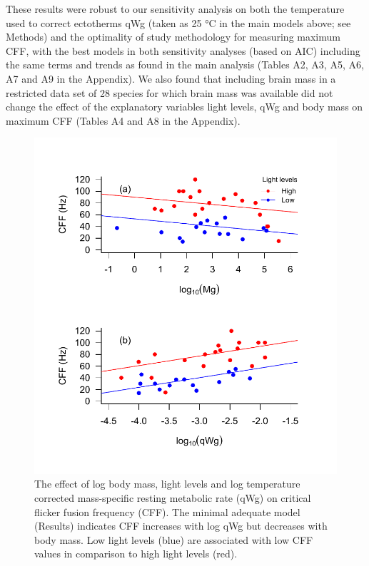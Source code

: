 These results were robust to our sensitivity analysis on both the temperature used to correct ectotherms qWg (taken as 25 °C in the main models above; see Methods) and the optimality of study methodology for measuring maximum CFF, with the best models in both sensitivity analyses (based on AIC) including the same terms and trends as found in the main analysis (Tables A2, A3, A5, A6, A7 and A9 in the Appendix). We also found that including brain mass in a restricted data set of 28 species for which brain mass was available did not change the effect of the explanatory variables light levels, qWg and body mass on maximum CFF (Tables A4 and A8 in the Appendix).


\begin{figure}[h!]
  \centering
  \includegraphics[width=.95\textwidth]{ch2-time/Figure_2}%
  \caption[Figure 3.]{ The effect of  log body mass, light levels and log temperature corrected mass-specific resting metabolic rate (qWg) on critical flicker fusion frequency (CFF). The minimal adequate model (Results) indicates CFF increases with log qWg but decreases with body mass. Low light levels (blue) are associated with low CFF values in comparison to high light levels (red).}
  \label{fig:Figure 3.}
\end{figure}


